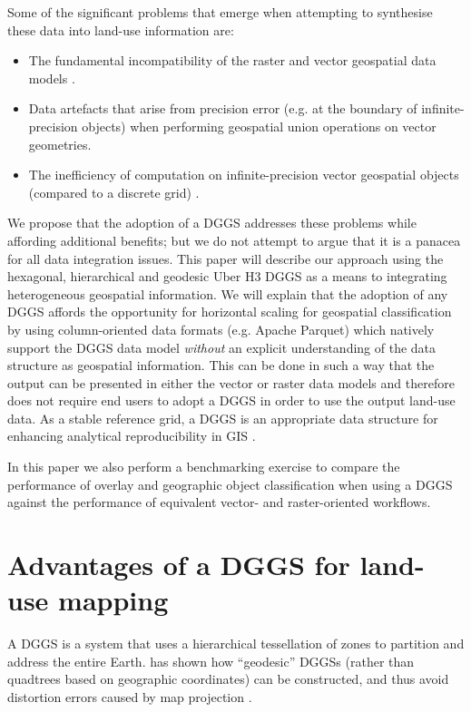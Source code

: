 \documentclass[]{interact}
\theoremstyle{plain}%
\theoremstyle{definition}
\theoremstyle{remark}
\begin{document}
Some of the significant problems that emerge when attempting to synthesise these data into land-use information are:

\begin{itemize}
    \item The fundamental incompatibility of the raster and vector geospatial data models \citep{piwowar1990integration,goodchild1994integrating}.
    \item Data artefacts that arise from precision error (e.g. at the boundary of infinite-precision objects) when performing geospatial union operations on vector geometries. \citep{schneider2003design,veregin1989error}
    \item The inefficiency of computation on infinite-precision vector geospatial objects (compared to a discrete grid) \citep{hojati2022giscience}.
\end{itemize}

We propose that the adoption of a \acf{DGGS} addresses these problems while affording additional benefits; but we do not attempt to argue that it is a panacea for all data integration issues. This paper will describe our approach using the hexagonal, hierarchical and geodesic Uber H3 \ac{DGGS} \citep{brodsky2018h3} as a means to integrating heterogeneous geospatial information. We will explain that the adoption of any \ac{DGGS} affords the opportunity for horizontal scaling for geospatial classification by using column-oriented data formats (e.g. Apache Parquet) which natively support the \ac{DGGS} data model \textit{without} an explicit understanding of the data structure as geospatial information. This can be done in such a way that the output can be presented in either the vector or raster data models and therefore does not require end users to adopt a \ac{DGGS} in order to use the output land-use data. As a stable reference grid, a \ac{DGGS} is an appropriate data structure for enhancing analytical reproducibility in \ac{GIS} \citep{etherington2022}.

In this paper we also perform a benchmarking exercise to compare the performance of overlay and geographic object classification when using a \ac{DGGS} against the performance of equivalent vector- and raster-oriented workflows.

\section{Advantages of a \ac{DGGS} for land-use mapping} %

A \ac{DGGS} is a system that uses a hierarchical tessellation of zones to partition and address the entire Earth. \citet{sahr2003geodesic} has shown how ``geodesic'' \acp{DGGS} (rather than quadtrees based on geographic coordinates) can be constructed, and thus avoid distortion errors caused by map projection \citep{goodchild2018reimagining}.
\end{document}
